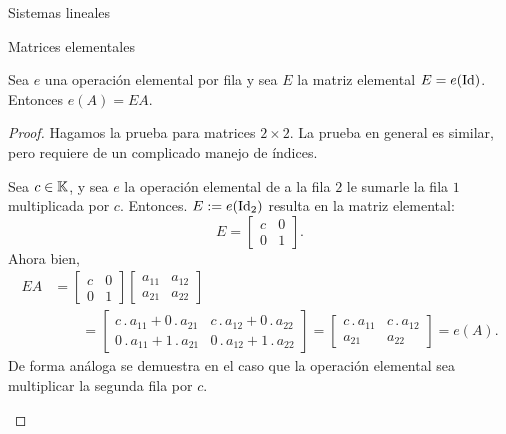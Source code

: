 \begin{chapter}{Sistemas lineales}
\begin{section}{Matrices elementales}
            \begin{teorema}\label{th-mrtx-elem}
                Sea $e$ una operación elemental por fila y sea $E$ la matriz elemental $E=e(\operatorname{Id})$. Entonces $e(A) = EA$.
            \end{teorema}
            \begin{proof}
                Hagamos la prueba para matrices $2 \times 2$. La prueba en general es similar, pero requiere de un complicado manejo de índices.
                \begin{enumelem}
                    \item Sea  $c \in \mathbb K$, y  sea $e$ la operación elemental de a la fila $2$ le sumarle  la fila $1$ multiplicada por $c$. Entonces. $E:=e(\operatorname{Id}_2)$ resulta en la matriz elemental:
                    \begin{equation*}
                    E= \begin{bmatrix} c& 0\\ 0&1\end{bmatrix}.
                    \end{equation*}
                    Ahora bien,
                    \begin{align*}
                    E A&=\begin{bmatrix} c& 0\\ 0&1\end{bmatrix}
                    \begin{bmatrix} a_{11}&a_{12}\\a_{21}&a_{22}\end{bmatrix} \\
                    &\qquad= 
                    \begin{bmatrix} 
                    c\,.\,a_{11} + 0 \,.\,a_{21}&c\,.\,a_{12}+0\,.\,a_{22}\\
                    0\,.\,a_{11} + 1 \,.\,a_{21}&0\,.\,a_{12}+1\,.\,a_{22}\end{bmatrix} 
                    =
                    \begin{bmatrix} 
                    c\,.\,a_{11}&c\,.\,a_{12}\\
                    a_{21}&a_{22}\end{bmatrix} = e(A).
                    \end{align*}
                    De forma análoga se demuestra en el caso que la operación elemental sea  multiplicar la segunda fila por $c$.
                    

\end{enumelem}
\end{proof}
\end{section}
\end{chapter}
